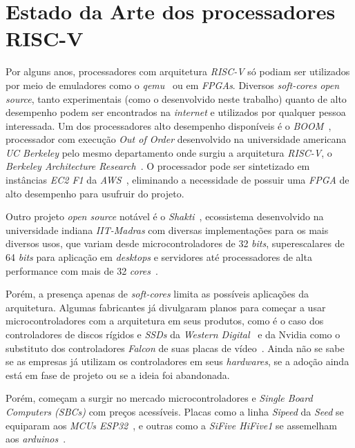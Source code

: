 \section{Estado da Arte dos processadores RISC-V}
{ Por alguns anos, processadores com arquitetura \textit{RISC-V} só podiam
    ser utilizados por meio de emuladores como o \textit{qemu}~\cite{qemu_riscv}
    ou em \textit{FPGAs}. Diversos \textit{soft-cores} \textit{open source},
    tanto experimentais (como o desenvolvido neste trabalho) quanto de alto
    desempenho podem ser encontrados na \textit{internet} e utilizados por
    qualquer pessoa interessada. Um dos processadores alto desempenho disponíveis
    é o \textit{BOOM}~\cite{boom_berkeley}, processador com execução
    \textit{Out of Order} desenvolvido na universidade americana \textit{UC Berkeley}
    pelo mesmo departamento onde surgiu a arquitetura \textit{RISC-V}, o
    \textit{Berkeley Architecture Research}~\cite{berkeley_bar}. O processador
    pode ser sintetizado em instâncias \textit{EC2 F1} da
    \textit{AWS}~\cite{boom_aws}, eliminando a necessidade de possuir uma
    \textit{FPGA} de alto desempenho para usufruir do projeto.
}

{ Outro projeto \textit{open source} notável é o \textit{Shakti}~\cite{shakti},
    ecossistema desenvolvido na universidade indiana \textit{IIT-Madras} com
    diversas implementações para os mais diversos usos, que variam desde
    microcontroladores de 32 \textit{bits}, superescalares de 64 \textit{bits}
    para aplicação em \textit{desktops} e servidores até processadores de alta
    performance com mais de 32 \textit{cores}~\cite{shakti_types}.
}

{ Porém, a presença apenas de \textit{soft-cores} limita as possíveis aplicações
    da arquitetura. Algumas fabricantes já divulgaram planos para começar a usar
    microcontroladores com a arquitetura em seus produtos, como é o caso dos
    controladores de discos rígidos e \textit{SSDs} da
    \textit{Western Digital}~\cite{western_riscv} e da Nvidia como o substituto
    dos controladores \textit{Falcon} de suas placas de vídeo~\cite{nvidia_riscv}.
    Ainda não se sabe se as empresas já utilizam os controladores em seus
    \textit{hardwares}, se a adoção ainda está em fase de projeto ou se a ideia
    foi abandonada.
}

{ Porém, começam a surgir no mercado microcontroladores e \textit{Single
    Board Computers (SBCs)} com preços acessíveis. Placas como a linha
    \textit{Sipeed} da \textit{Seed} se equiparam aos \textit{MCUs
    ESP32}~\cite{hackaday_sipeed}, e outras como a \textit{SiFive HiFive1}
    se assemelham aos \textit{arduinos}~\cite{hifive_arduino}.
}


